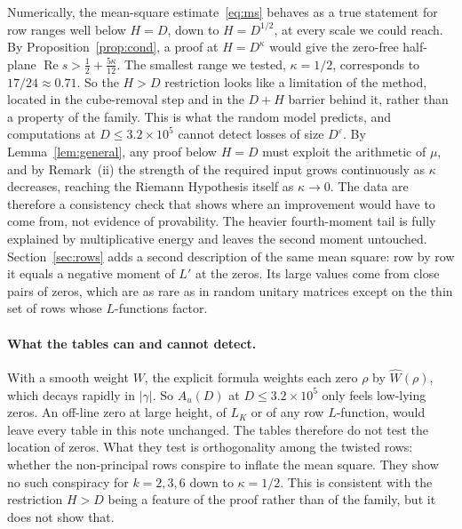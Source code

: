 \documentclass[11pt]{article}
\theoremstyle{remark}
\begin{document}
Numerically, the mean-square estimate~\eqref{eq:ms} behaves as a true statement for row
ranges well below $H=D$, down to $H=D^{1/2}$, at every scale we could reach. By
Proposition~\ref{prop:cond}, a proof at $H=D^\kappa$ would give the zero-free half-plane
$\operatorname{Re}s>\frac12+\frac{5\kappa}{12}$. The smallest range we tested, $\kappa=1/2$,
corresponds to $17/24\approx0.71$. So the $H>D$ restriction looks like a limitation of the
method, located in the cube-removal step and in the $D+H$ barrier behind it, rather than a
property of the family. This is what the random model predicts, and computations at
$D\le3.2\times10^5$ cannot detect losses of size $D^\varepsilon$. By
Lemma~\ref{lem:general}, any proof below $H=D$ must exploit the arithmetic of $\mu$, and by
Remark~(ii) the strength of the required input grows continuously as $\kappa$ decreases,
reaching the Riemann Hypothesis itself as $\kappa\to0$. The data are therefore a
consistency check that shows where an improvement would have to come from, not evidence of
provability. The heavier fourth-moment tail is fully explained by multiplicative energy and
leaves the second moment untouched. Section~\ref{sec:rows} adds a second description of the same
mean square: row by row it equals a negative moment of $L'$ at the zeros. Its large values come
from close pairs of zeros, which are as rare as in random unitary matrices except on the thin
set of rows whose $L$-functions factor.

\paragraph{What the tables can and cannot detect.} With a smooth weight $W$, the explicit
formula weights each zero $\rho$ by $\widehat W(\rho)$, which decays rapidly in $|\gamma|$.
So $A_u(D)$ at $D\le3.2\times10^5$ only feels low-lying zeros. An off-line zero at large
height, of $L_K$ or of any row $L$-function, would leave every table in this note unchanged.
The tables therefore do not test the location of zeros. What they test is orthogonality among
the twisted rows: whether the non-principal rows conspire to inflate the mean square. They
show no such conspiracy for $k=2,3,6$ down to $\kappa=1/2$. This is consistent with the
restriction $H>D$ being a feature of the proof rather than of the family, but it does not
show that.
\end{document}
